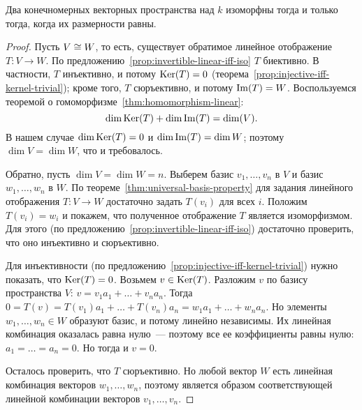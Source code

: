 \begin{theorem}\label{thm:isomorphic-iff-equidimensional}
Два конечномерных векторных пространства над $k$ изоморфны тогда и только тогда,
когда их размерности равны.
\end{theorem}
\begin{proof}
Пусть $V\cong W$, то есть, существует обратимое линейное отображение $T\colon V\to W$.
По предложению~\ref{prop:invertible-linear-iff-iso} $T$ биективно. В частности,
$T$ инъективно, и потому $\operatorname{Ker}(T)=0$ (теорема~\ref{prop:injective-iff-kernel-trivial});
кроме того, $T$ сюръективно, и потому $\operatorname{Im}(T)=W$.
Воспользуемся теоремой о гомоморфизме~\ref{thm:homomorphism-linear}:
$$
\dim\operatorname{Ker}(T) + \dim\operatorname{Im}(T) = \dim(V).
$$
В нашем случае $\dim\operatorname{Ker}(T)=0$ и $\dim\operatorname{Im}(T)=\dim W$; поэтому $\dim V = \dim W$, что и
требовалось.

Обратно, пусть $\dim V = \dim W = n$. Выберем базис $v_1,\dots,v_n$ в $V$
и базис $w_1,\dots,w_n$ в $W$. По теореме~\ref{thm:universal-basis-property} для задания
линейного отображения $T\colon V\to W$ достаточно задать $T(v_i)$ для всех $i$.
Положим $T(v_i)=w_i$ и покажем, что полученное отображение $T$ является изоморфизмом.
Для этого (по предложению~\ref{prop:invertible-linear-iff-iso}) достаточно проверить,
что оно инъективно и сюръективно.

Для инъективности
(по предложению~\ref{prop:injective-iff-kernel-trivial}) нужно показать, что $\operatorname{Ker}(T)=0$.
Возьмем $v\in\operatorname{Ker}(T)$. Разложим $v$ по базису пространства $V$:
$v = v_1a_1 + \dots + v_na_n$. Тогда
$0 = T(v) = T(v_1)a_1+\dots+T(v_n)a_n = w_1a_1+\dots+w_na_n$.
Но элементы $w_1,\dots,w_n\in W$ образуют базис, и потому линейно независимы. Их
линейная комбинация оказалась равна нулю~--- поэтому все ее коэффициенты равны
нулю: $a_1=\dots=a_n=0$. Но тогда и $v = 0$.

Осталось проверить, что $T$ сюръективно. Но любой вектор $W$ есть линейная комбинация
векторов $w_1,\dots,w_n$, поэтому является образом соответствующей линейной комбинации
векторов $v_1,\dots,v_n$.
\end{proof}

